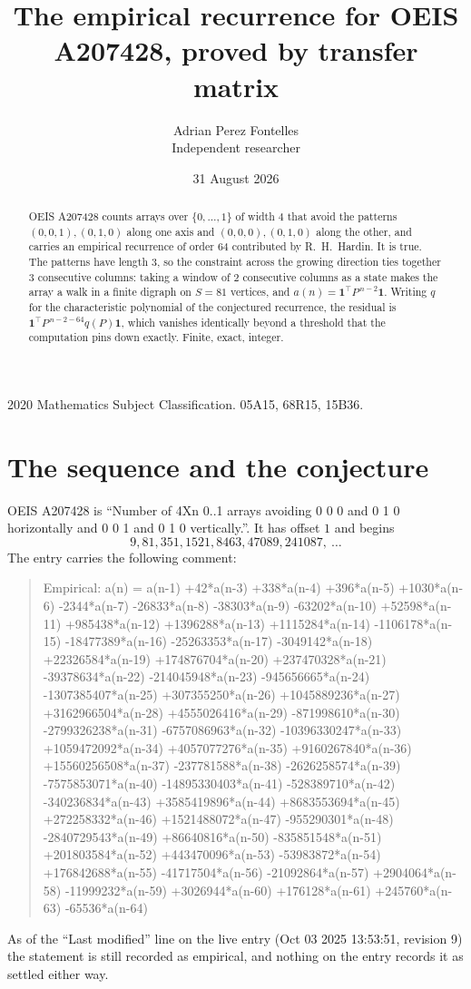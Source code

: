 \documentclass[11pt,a4paper]{article}
\title{The empirical recurrence for OEIS A207428, proved by transfer matrix}
\author{Adrian Perez Fontelles\\ \small Independent researcher}
\date{31 August 2026}
\theoremstyle{plain}
\theoremstyle{definition}
\begin{document}
\maketitle

\begin{abstract}
OEIS A207428 counts arrays over $\{0,\dots,1\}$ of width $4$ that avoid the patterns
$(0,0,1), (0,1,0)$ along one axis and $(0,0,0), (0,1,0)$ along the other, and carries an empirical recurrence of
order $64$ contributed by R.~H.~Hardin. It is true. The patterns have length $3$, so
the constraint across the growing direction ties together $3$ consecutive columns: taking a
window of $2$ consecutive columns as a state makes the array a walk in a finite digraph
on $S=81$ vertices, and $a(n)=\mathbf{1}^{\!\top}P^{\,n-2}\mathbf{1}$. Writing $q$
for the characteristic polynomial of the conjectured recurrence, the residual is
$\mathbf{1}^{\!\top}P^{\,n-2-64}q(P)\mathbf{1}$, which vanishes identically
beyond a threshold that the computation pins down exactly. Finite, exact, integer.
\end{abstract}

\noindent\small 2020 Mathematics Subject Classification. 05A15, 68R15, 15B36.\normalsize

\section{The sequence and the conjecture}

OEIS A207428 is ``Number of 4Xn 0..1 arrays avoiding 0 0 0 and 0 1 0 horizontally and 0 0 1 and 0 1 0 vertically.''. It has offset
$1$ and begins
\[
9, 81, 351, 1521, 8463, 47089, 241087,\ \dots
\]
The entry carries the following comment:
\begin{quote}\small
Empirical: a(n) = a(n-1) +42*a(n-3) +338*a(n-4) +396*a(n-5) +1030*a(n-6) -2344*a(n-7) -26833*a(n-8) -38303*a(n-9) -63202*a(n-10) +52598*a(n-11) +985438*a(n-12) +1396288*a(n-13) +1115284*a(n-14) -1106178*a(n-15) -18477389*a(n-16) -25263353*a(n-17) -3049142*a(n-18) +22326584*a(n-19) +174876704*a(n-20) +237470328*a(n-21) -39378634*a(n-22) -214045948*a(n-23) -945656665*a(n-24) -1307385407*a(n-25) +307355250*a(n-26) +1045889236*a(n-27) +3162966504*a(n-28) +4555026416*a(n-29) -871998610*a(n-30) -2799326238*a(n-31) -6757086963*a(n-32) -10396330247*a(n-33) +1059472092*a(n-34) +4057077276*a(n-35) +9160267840*a(n-36) +15560256508*a(n-37) -237781588*a(n-38) -2626258574*a(n-39) -7575853071*a(n-40) -14895330403*a(n-41) -528389710*a(n-42) -340236834*a(n-43) +3585419896*a(n-44) +8683553694*a(n-45) +272258332*a(n-46) +1521488072*a(n-47) -955290301*a(n-48) -2840729543*a(n-49) +86640816*a(n-50) -835851548*a(n-51) +201803584*a(n-52) +443470096*a(n-53) -53983872*a(n-54) +176842688*a(n-55) -41717504*a(n-56) -21092864*a(n-57) +2904064*a(n-58) -11999232*a(n-59) +3026944*a(n-60) +176128*a(n-61) +245760*a(n-63) -65536*a(n-64)
\end{quote}
As of the ``Last modified'' line on the live entry (Oct 03 2025 13:53:51, revision
9) the statement is still recorded as empirical, and nothing on the entry
records it as settled either way.
\end{document}
